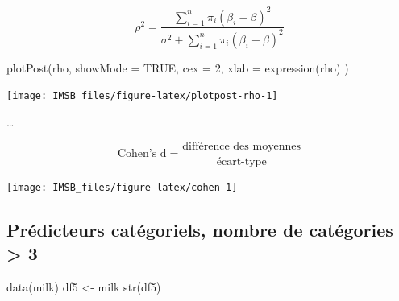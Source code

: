 \documentclass[
  a4paper,11pt,twoside,onecolumn,openright,final,oldfontcommands]{memoir}
\newenvironment{Shaded}{\begin{snugshade}}{\end{snugshade}}
\newcommand{\AttributeTok}[1]{\textcolor[rgb]{0.77,0.63,0.00}{#1}}
\newcommand{\ConstantTok}[1]{\textcolor[rgb]{0.00,0.00,0.00}{#1}}
\newcommand{\DecValTok}[1]{\textcolor[rgb]{0.00,0.00,0.81}{#1}}
\newcommand{\FunctionTok}[1]{\textcolor[rgb]{0.00,0.00,0.00}{#1}}
\newcommand{\NormalTok}[1]{#1}
\newcommand{\OtherTok}[1]{\textcolor[rgb]{0.56,0.35,0.01}{#1}}
\newcommand{\SpecialCharTok}[1]{\textcolor[rgb]{0.00,0.00,0.00}{#1}}
\theoremstyle{definition}
\theoremstyle{definition}
\theoremstyle{definition}
\theoremstyle{definition}
\theoremstyle{remark}
\begin{document}
\[
\rho^{2} = \dfrac{\sum_{i=1}^{n} \pi_{i}(\beta_{i} - \beta)^{2}}{\sigma^{2} + \sum_{i=1}^{n} \pi_{i}(\beta_{i} - \beta)^{2}}
\]

\begin{Shaded}
\begin{Highlighting}[]
\FunctionTok{plotPost}\NormalTok{(rho, }\AttributeTok{showMode =} \ConstantTok{TRUE}\NormalTok{, }\AttributeTok{cex =} \DecValTok{2}\NormalTok{, }\AttributeTok{xlab =} \FunctionTok{expression}\NormalTok{(rho) )}
\end{Highlighting}
\end{Shaded}

\begin{center}\texttt{[image: IMSB\_files/figure-latex/plotpost-rho-1]} \end{center}

\ldots{}

\[
\text{Cohen's d} = \frac{\text{différence des moyennes}}{\text{écart-type}}
\]

\begin{Shaded}
\end{Shaded}

\begin{center}\texttt{[image: IMSB\_files/figure-latex/cohen-1]} \end{center}

\hypertarget{pruxe9dicteurs-catuxe9goriels-nombre-de-catuxe9gories-3}{%
\subsection{Prédicteurs catégoriels, nombre de catégories \textgreater{} 3}\label{pruxe9dicteurs-catuxe9goriels-nombre-de-catuxe9gories-3}}

\begin{Shaded}
\begin{Highlighting}[]
\FunctionTok{data}\NormalTok{(milk)}
\NormalTok{df5 }\OtherTok{\textless{}{-}}\NormalTok{ milk}
\FunctionTok{str}\NormalTok{(df5)}
\end{Highlighting}
\end{Shaded}
\end{document}
